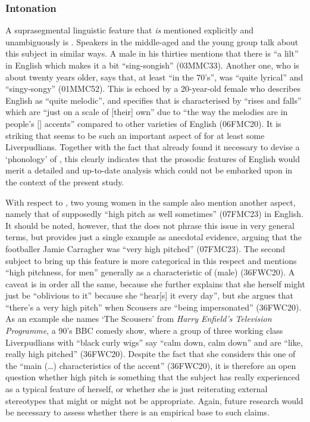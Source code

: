 \subsubsection{Intonation}

A suprasegmental linguistic feature that \emph{is} mentioned explicitly and unambiguously is .
Speakers in the middle-aged and the young group talk about this subject in similar ways.
A male in his thirties mentions that there is ``a lilt'' in  English which makes it a bit ``sing-songish'' (03MMC33).
Another one, who is about twenty years older, says that, at least ``in the 70's'',  was ``quite lyrical'' and ``singy-songy'' (01MMC52).
This is echoed by a 20-year-old female who describes  English as ``quite melodic'', and specifies that   is characterised by ``rises and falls'' which are ``just on a scale of [their] own'' due to ``the way the melodies are in people's [] accents'' compared to other varieties of English (06FMC20).
It is striking that  seems to be such an important aspect of  for at least some Liverpudlians.
Together with the fact that \textcite{knowles1973} already found it necessary to devise a `phonology' of  , this clearly indicates that the prosodic features of  English would merit a detailed and up-to-date analysis which could not be embarked upon in the context of the present study.

With respect to , two young women in the sample also mention another aspect, namely that of supposedly ``high pitch as well sometimes'' (07FMC23) in  English.
It should be noted, however, that the  does not phrase this issue in very general terms, but provides just a single example as anecdotal evidence, arguing that the footballer Jamie Carragher was ``very high pitched'' (07FMC23).
The second subject to bring up this feature is more categorical in this respect and mentions ``high pitchness, for men'' generally as a characteristic of (male)  (36FWC20).
A caveat is in order all the same, because she further explains that she herself might just be ``oblivious to it'' because she ``hear[s] it every day'', but she argues that ``there's a very high pitch'' when Scousers are ``being impersonated'' (36FWC20).
As an example she names `The Scousers' from \emph{Harry Enfield's Television Programme}, a 90's BBC comedy show, where a group of three  working class Liverpudlians with ``black curly wigs'' say ``calm down, calm down'' and are ``like, really high pitched'' (36FWC20).
Despite the fact that she considers this one of the ``main (\ldots) characteristics of the accent'' (36FWC20), it is therefore an open question whether high pitch is something that the subject has really experienced as a typical feature of  herself, or whether she is just reiterating external stereotypes that might or might not be appropriate.
Again, future research would be necessary to assess whether there is an empirical base to such claims.

